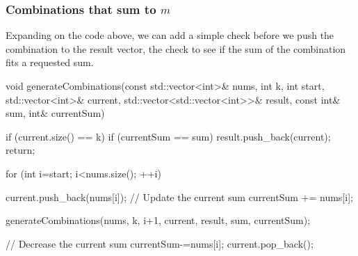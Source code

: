 \documentclass{report}
\begin{document}
\pagebreak 
\bigbreak \noindent 
\subsubsection{Combinations that sum to $m$}
\bigbreak \noindent 
Expanding on the code above, we can add a simple check before we push the combination to the result vector, the check to see if the sum of the combination fits a requested sum.
\bigbreak \noindent 
\begin{cppcode}
    void generateCombinations(const std::vector<int>& nums, int k, int start, std::vector<int>& current, std::vector<std::vector<int>>& result, const int& sum, int& currentSum) {
        if (current.size() == k) {
            if (currentSum == sum)  {
                result.push_back(current);
            }
            return;
        }

        for (int i=start; i<nums.size(); ++i) {
            current.push_back(nums[i]);
            // Update the current sum
            currentSum += nums[i];

            generateCombinations(nums, k, i+1, current, result, sum, currentSum);

            // Decrease the current sum
            currentSum-=nums[i];
            current.pop_back();
        }
    }
\end{cppcode}

\pagebreak 
\end{document}
